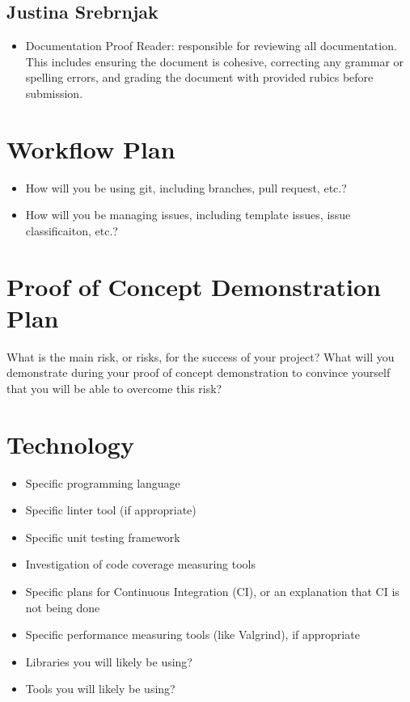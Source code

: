 \documentclass{article}
\begin{document}
\subsection{Justina Srebrnjak}

\begin{itemize}
	\item Documentation Proof Reader: responsible for reviewing all documentation. This includes ensuring the document is cohesive, correcting any grammar or spelling errors, and grading the document with provided rubics before submission.   
\end{itemize}

\section{Workflow Plan}

\begin{itemize}
	\item How will you be using git, including branches, pull request, etc.?
	\item How will you be managing issues, including template issues, issue
	classificaiton, etc.?
\end{itemize}

\section{Proof of Concept Demonstration Plan}

What is the main risk, or risks, for the success of your project?  What will you
demonstrate during your proof of concept demonstration to convince yourself that
you will be able to overcome this risk?

\section{Technology}

\begin{itemize}
\item Specific programming language
\item Specific linter tool (if appropriate)
\item Specific unit testing framework
\item Investigation of code coverage measuring tools
\item Specific plans for Continuous Integration (CI), or an explanation that CI
  is not being done
\item Specific performance measuring tools (like Valgrind), if
  appropriate
\item Libraries you will likely be using?
\item Tools you will likely be using?
\end{itemize}
\end{document}
